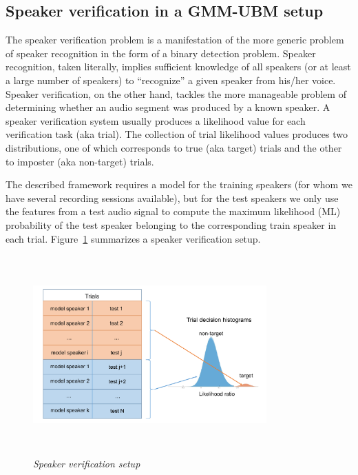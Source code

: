 \subsection{Speaker verification in a GMM-UBM setup} 
\label{ssec:ch3_GMMUBM}
The speaker verification problem is a manifestation of the more generic problem of speaker recognition in the form of a binary detection problem. 
Speaker recognition, taken literally, implies sufficient knowledge of all speakers (or at least a large number of speakers) to ``recognize'' a given speaker from his/her voice. 
Speaker verification, on the other hand, tackles the more manageable problem of determining whether an audio segment was produced by a known speaker. 
A speaker verification system usually produces a likelihood value for each verification task (aka trial). 
The collection of trial likelihood values produces two distributions, one of which corresponds to true (aka target) trials and the other to imposter (aka non-target) trials. 

The described framework requires a model for the training speakers (for whom we have several recording sessions available), but for the test speakers we only use the features from a test audio signal to compute the maximum likelihood (ML) probability of the test speaker belonging to the corresponding train speaker in each trial. 
Figure~\ref{fig:speaker_verification} summarizes a speaker verification setup. 

\begin{figure}[h!]
	\centering
	\vspace{0mm}
	\includegraphics[height = 3in, width=0.8\textwidth]{figures/speaker_verification_setup}
	\vspace{-3mm}
	\caption{\it Speaker verification setup}
	\label{fig:speaker_verification}
	\vspace{0mm}
\end{figure}

